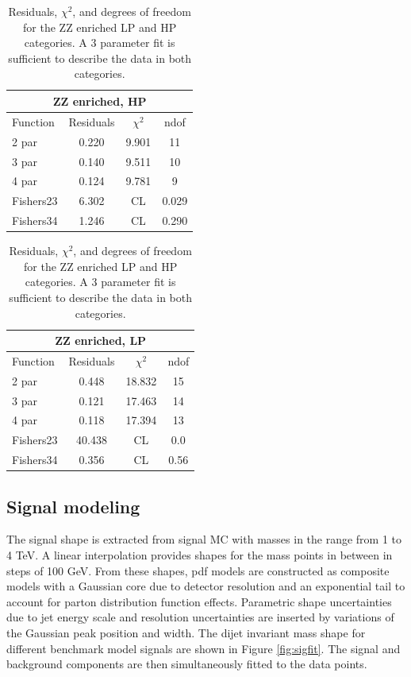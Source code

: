 \begin{table}[h!]
\centering
\begin{tabular}{|l c c c |}
\hline
\multicolumn{4}{|c|}{ZZ enriched, HP}\\
\hline
Function & Residuals & $\chi^2$ & ndof \\
\hline
2 par & 0.220 & 9.901 & 11 \\
3 par & 0.140 & 9.511 & 10 \\
4 par & 0.124 & 9.781 & 9 \\
\hline
\hline
Fishers23 & 6.302& CL & 0.029\\
Fishers34 & 1.246& CL & 0.290\\
\hline
\end{tabular}
\quad
\begin{tabular}{|l c c c |}
\hline
\multicolumn{4}{|c|}{ZZ enriched, LP}\\
\hline
Function & Residuals & $\chi^2$ & ndof \\
\hline
2 par & 0.448 & 18.832 & 15 \\
3 par & 0.121 & 17.463 & 14 \\
4 par & 0.118 & 17.394 & 13 \\
\hline
\hline
Fishers23 & 40.438& CL & 0.0\\
Fishers34 & 0.356& CL & 0.56\\
\hline
\end{tabular}
\caption{Residuals, $\chi^{2}$, and degrees of freedom for the ZZ enriched LP and HP categories. A 3 parameter fit is sufficient to describe the data in both categories.}
\label{tab:ZZ_enriched}
\end{table}

\clearpage
\subsection{Signal modeling}
\label{sec:searchI:sig}

The signal shape is extracted from signal MC with masses in the range from 1 to 4 TeV. A linear interpolation provides shapes for the mass points in between in steps of 100 GeV. From these shapes, pdf models are constructed as composite models with a Gaussian core due to detector resolution and an exponential tail to account for parton distribution function effects. Parametric shape uncertainties due to jet energy scale and resolution uncertainties are inserted by variations of the Gaussian peak position and width. The dijet invariant mass shape for different benchmark model signals are shown in Figure \ref{fig:sigfit}. The signal and background components are then simultaneously fitted to the data points.

